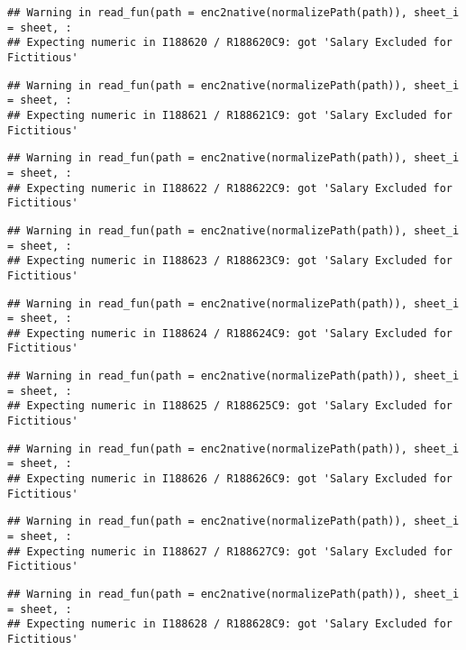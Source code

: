 \documentclass[
]{article}
\begin{document}
\begin{verbatim}
## Warning in read_fun(path = enc2native(normalizePath(path)), sheet_i = sheet, :
## Expecting numeric in I188620 / R188620C9: got 'Salary Excluded for Fictitious'
\end{verbatim}

\begin{verbatim}
## Warning in read_fun(path = enc2native(normalizePath(path)), sheet_i = sheet, :
## Expecting numeric in I188621 / R188621C9: got 'Salary Excluded for Fictitious'
\end{verbatim}

\begin{verbatim}
## Warning in read_fun(path = enc2native(normalizePath(path)), sheet_i = sheet, :
## Expecting numeric in I188622 / R188622C9: got 'Salary Excluded for Fictitious'
\end{verbatim}

\begin{verbatim}
## Warning in read_fun(path = enc2native(normalizePath(path)), sheet_i = sheet, :
## Expecting numeric in I188623 / R188623C9: got 'Salary Excluded for Fictitious'
\end{verbatim}

\begin{verbatim}
## Warning in read_fun(path = enc2native(normalizePath(path)), sheet_i = sheet, :
## Expecting numeric in I188624 / R188624C9: got 'Salary Excluded for Fictitious'
\end{verbatim}

\begin{verbatim}
## Warning in read_fun(path = enc2native(normalizePath(path)), sheet_i = sheet, :
## Expecting numeric in I188625 / R188625C9: got 'Salary Excluded for Fictitious'
\end{verbatim}

\begin{verbatim}
## Warning in read_fun(path = enc2native(normalizePath(path)), sheet_i = sheet, :
## Expecting numeric in I188626 / R188626C9: got 'Salary Excluded for Fictitious'
\end{verbatim}

\begin{verbatim}
## Warning in read_fun(path = enc2native(normalizePath(path)), sheet_i = sheet, :
## Expecting numeric in I188627 / R188627C9: got 'Salary Excluded for Fictitious'
\end{verbatim}

\begin{verbatim}
## Warning in read_fun(path = enc2native(normalizePath(path)), sheet_i = sheet, :
## Expecting numeric in I188628 / R188628C9: got 'Salary Excluded for Fictitious'
\end{verbatim}
\end{document}

